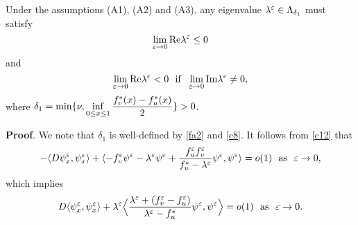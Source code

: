 \documentclass[a4,10pt]{article}
\begin{document}
\begin{theo}\label{th3} 
Under the assumptions (A1), (A2) and (A3), any eigenvalue 
$\lambda^\varepsilon \in \Lambda_{\delta_1}$ must satisfy
$$ \displaystyle\lim_{\varepsilon \to 0} \text{\rm Re} \lambda^\varepsilon \leq 0 $$
and 
$$ \dis\lim_{\ep \to 0} \text{\rm Re} \lambda^\ep < 0 \ \ 
\text{if} \ \ \dis\lim_{\ep \to 0} \text{\rm Im} \lambda^\ep \neq 0, $$ 
where $\delta_1 = \min\{ \nu, \displaystyle\inf_{0 \leq x \leq 1 } \displaystyle\frac{f_v^*(x) - f_u^*(x)}{2} \} > 0$.
\end{theo}

{\bf Proof}. 
We note that $\delta_1$ is well-defined by \eqref{fa2} and \eqref{c8}.
It follows from \eqref{c12} that
$$
- \langle D \psi^\varepsilon_{x},  \psi^\varepsilon_{x} \rangle + \langle - f_v^\varepsilon \psi^\varepsilon - \lambda^\varepsilon \psi^\varepsilon
 + \frac{f_u^\varepsilon f_v^\varepsilon }{f_u^* - \lambda^\varepsilon}\psi^\varepsilon, \psi^\varepsilon \rangle = o(1)
\ \ \text{as} \ \ \varepsilon \to 0,
$$
which implies
%
\[%
D \lg  \psi^\ep_x, \psi^\ep_x \rg  + \lambda^\ep \Big{\lg} 
\frac{\lambda^\ep + (f_v^\ep - f_u^\ep )}{\lambda^\ep - f_u^*}\psi^\ep, \psi^\ep \Big{\rg} = o(1)
\ \ \text{as} \ \ \ep \to 0.
\]%
\end{document}
